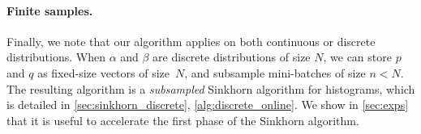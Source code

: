 
\paragraph{Finite samples.}Finally, we note that our algorithm
applies on both continuous or discrete distributions. When $\alpha$ and $\beta$
are discrete distributions of size $N$, we can store $p$ and $q$ as fixed-size
vectors of size~$N$, and subsample mini-batches of size $n < N$. The resulting
algorithm is a \textit{subsampled} Sinkhorn algorithm for histograms, which is
detailed in \autoref{sec:sinkhorn_discrete}, \autoref{alg:discrete_online}. We show in \autoref{sec:exps} that it
is useful to accelerate the first phase of the Sinkhorn algorithm.


